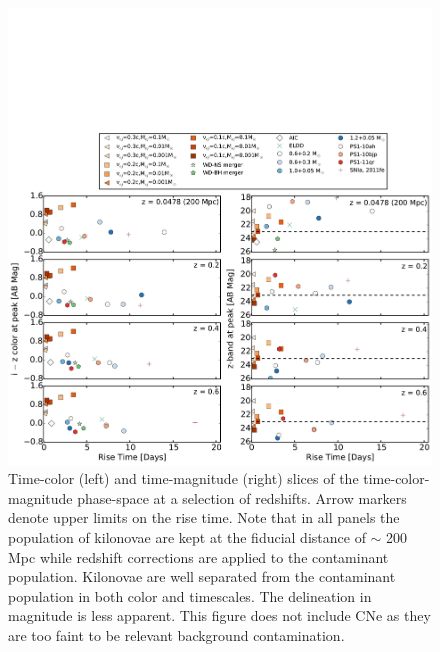 \begin{figure}[t!]
\centering
\includegraphics[width=\textwidth]{./figs/chapter2/f3.pdf}
\caption{\singlespace Time-color (left) and time-magnitude (right) slices of the time-color-magnitude phase-space at a selection of redshifts. Arrow markers denote upper limits on the rise time. Note that in all panels the population of kilonovae are kept at the fiducial distance of $\sim$ 200 Mpc while redshift corrections are applied to the contaminant population. Kilonovae are well separated from the contaminant population in both color and timescales. The delineation in magnitude is less apparent. This figure does not include CNe as they are too faint to be relevant background contamination.}
\label{fig:ch2_phase}
\end{figure}

